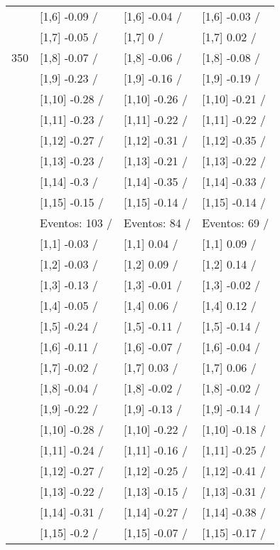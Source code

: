 \begin{table}
\begin{tabular}[t]{llll}
 & {}[1,6] -0.09  / & {}[1,6] -0.04  / & {}[1,6] -0.03  /\\
 & {}[1,7] -0.05  / & {}[1,7] 0  / & {}[1,7] 0.02  /\\
350 & {}[1,8] -0.07  / & {}[1,8] -0.06  / & {}[1,8] -0.08  /\\
\addlinespace
 & {}[1,9] -0.23  / & {}[1,9] -0.16  / & {}[1,9] -0.19  /\\
 & {}[1,10] -0.28  / & {}[1,10] -0.26  / & {}[1,10] -0.21  /\\
 & {}[1,11] -0.23  / & {}[1,11] -0.22  / & {}[1,11] -0.22  /\\
 & {}[1,12] -0.27  / & {}[1,12] -0.31  / & {}[1,12] -0.35  /\\
 & {}[1,13] -0.23  / & {}[1,13] -0.21  / & {}[1,13] -0.22  /\\
\addlinespace
 & {}[1,14] -0.3  / & {}[1,14] -0.35  / & {}[1,14] -0.33  /\\
 & {}[1,15] -0.15  / & {}[1,15] -0.14  / & {}[1,15] -0.14  /\\
 & Eventos:  103 / & Eventos:  84 / & Eventos:  69 /\\
 & {}[1,1] -0.03  / & {}[1,1] 0.04  / & {}[1,1] 0.09  /\\
 & {}[1,2] -0.03  / & {}[1,2] 0.09  / & {}[1,2] 0.14  /\\
\addlinespace
 & {}[1,3] -0.13  / & {}[1,3] -0.01  / & {}[1,3] -0.02  /\\
 & {}[1,4] -0.05  / & {}[1,4] 0.06  / & {}[1,4] 0.12  /\\
 & {}[1,5] -0.24  / & {}[1,5] -0.11  / & {}[1,5] -0.14  /\\
 & {}[1,6] -0.11  / & {}[1,6] -0.07  / & {}[1,6] -0.04  /\\
 & {}[1,7] -0.02  / & {}[1,7] 0.03  / & {}[1,7] 0.06  /\\
\addlinespace
500 & {}[1,8] -0.04  / & {}[1,8] -0.02  / & {}[1,8] -0.02  /\\
 & {}[1,9] -0.22  / & {}[1,9] -0.13  / & {}[1,9] -0.14  /\\
 & {}[1,10] -0.28  / & {}[1,10] -0.22  / & {}[1,10] -0.18  /\\
 & {}[1,11] -0.24  / & {}[1,11] -0.16  / & {}[1,11] -0.25  /\\
 & {}[1,12] -0.27  / & {}[1,12] -0.25  / & {}[1,12] -0.41  /\\
\addlinespace
 & {}[1,13] -0.22  / & {}[1,13] -0.15  / & {}[1,13] -0.31  /\\
 & {}[1,14] -0.31  / & {}[1,14] -0.27  / & {}[1,14] -0.38  /\\
 & {}[1,15] -0.2  / & {}[1,15] -0.07  / & {}[1,15] -0.17  /\\
\bottomrule
\end{tabular}
\end{table}
